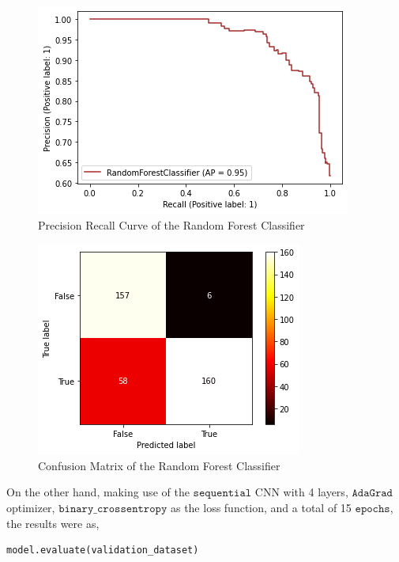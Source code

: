 \documentclass[conference]{IEEEtran}
\begin{document}
\begin{figure}[htbp]
\label{fig5}
\centerline{\includegraphics[width = \linewidth]{5}}
\caption{Precision Recall Curve of the Random Forest Classifier}
\end{figure}
\begin{figure}[htbp]
\label{fig6}
\centerline{\includegraphics[width = \linewidth]{6}}
\caption{Confusion Matrix of the Random Forest Classifier}
\end{figure}
On the other hand, making use of the $\mathtt{sequential}$ CNN with 4 layers, $\mathtt{AdaGrad}$ optimizer, $\mathtt{binary\_crossentropy}$ as the loss function, and a total of 15 $\mathtt{epochs}$, the results were as, 
\begin{verbatim}
model.evaluate(validation_dataset)
\end{verbatim}
\end{document}

